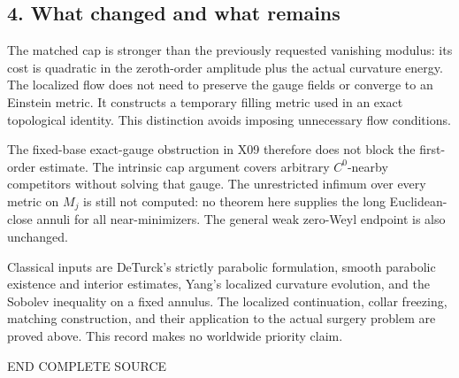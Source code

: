 \documentclass[
  10pt,
]{article}
\begin{document}
\hypertarget{what-changed-and-what-remains}{%
\subsection{4. What changed and what
remains}\label{what-changed-and-what-remains}}

The matched cap is stronger than the previously requested vanishing
modulus: its cost is quadratic in the zeroth-order amplitude plus the
actual curvature energy. The localized flow does not need to preserve
the gauge fields or converge to an Einstein metric. It constructs a
temporary filling metric used in an exact topological identity. This
distinction avoids imposing unnecessary flow conditions.

The fixed-base exact-gauge obstruction in X09 therefore does not block
the first-order estimate. The intrinsic cap argument covers arbitrary
\(C^0\)-nearby competitors without solving that gauge. The unrestricted
infimum over every metric on \(M_j\) is still not computed: no theorem
here supplies the long Euclidean-close annuli for all near-minimizers.
The general weak zero-Weyl endpoint is also unchanged.

Classical inputs are DeTurck's strictly parabolic formulation, smooth
parabolic existence and interior estimates, Yang's localized curvature
evolution, and the Sobolev inequality on a fixed annulus. The localized
continuation, collar freezing, matching construction, and their
application to the actual surgery problem are proved above. This record
makes no worldwide priority claim.

END COMPLETE SOURCE
\end{document}
